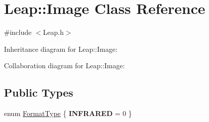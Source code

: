\hypertarget{class_leap_1_1_image}{}\section{Leap\+:\+:Image Class Reference}
\label{class_leap_1_1_image}


{\ttfamily \#include $<$Leap.\+h$>$}



Inheritance diagram for Leap\+:\+:Image\+:


Collaboration diagram for Leap\+:\+:Image\+:
\subsection*{Public Types}
\begin{DoxyCompactItemize}
\item 
enum \hyperlink{class_leap_1_1_image_acefbe5d3803afc9f433a6e3856d242d1}{Format\+Type} \{ {\bfseries I\+N\+F\+R\+A\+R\+ED} = 0
 \}
\end{DoxyCompactItemize}
